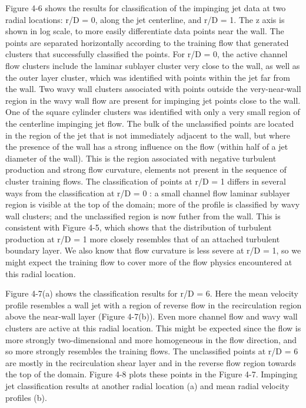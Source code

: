 Figure 4-6 shows the results for classiﬁcation of the impinging jet data at two radial locations: r/D = 0, along the jet centerline, and r/D = 1. The z axis is shown in log scale, to more easily differentiate data points near the wall. The points are separated horizontally according to the training ﬂow that generated clusters that successfully classiﬁed the points. For r/D = 0, the active channel ﬂow clusters include the laminar sublayer cluster very close to the wall, as well as the outer layer cluster, which was identiﬁed with points within the jet far from the wall. Two wavy wall clusters associated with points outside the very-near-wall region in the wavy wall ﬂow are present for impinging jet points close to the wall. One of the square cylinder clusters was identiﬁed with only a very small region of the centerline impinging jet ﬂow. The bulk of the unclassiﬁed points are located in the region of the jet that is not immediately adjacent to the wall, but where the presence of the wall has a strong inﬂuence on the ﬂow (within half of a jet diameter of the wall). This is the region associated with negative turbulent production and strong ﬂow curvature, elements not present in the sequence of cluster training ﬂows. The classiﬁcation of points at r/D = 1 differs in several ways from the classiﬁcation at r/D = 0 : a small channel ﬂow laminar sublayer region is visible at the top of the domain; more of the proﬁle is classiﬁed by wavy wall clusters; and the unclassiﬁed region is now futher from the wall. This is consistent with Figure 4-5, which shows that the distribution of turbulent production at r/D = 1 more closely resembles that of an attached turbulent boundary layer. We also know that ﬂow curvature is less severe at r/D = 1, so we might expect the training ﬂow to cover more of the ﬂow physics encountered at this radial location.

Figure 4-7(a) shows the classiﬁcation results for r/D = 6. Here the mean velocity proﬁle resembles a wall jet with a region of reverse ﬂow in the recirculation region above the near-wall layer (Figure 4-7(b)). Even more channel ﬂow and wavy wall clusters are active at this radial location. This might be expected since the ﬂow is more strongly two-dimensional and more homogeneous in the ﬂow direction, and so more strongly resembles the training ﬂows. The unclassiﬁed points at r/D = 6 are mostly in the recirculation shear layer and in the reverse ﬂow region towards the top of the domain. Figure 4-8 plots these points in the Figure 4-7. Impinging jet classiﬁcation results at another radial location (a) and mean radial velocity proﬁles (b). 


